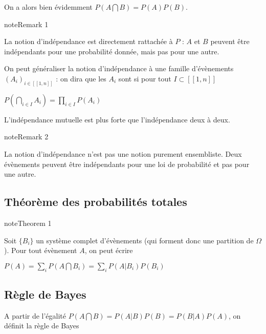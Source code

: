 \documentclass[letterpaper,10pt,english]{jupyterBook}
\begin{document}
\sphinxAtStartPar
On a alors bien évidemment \(P(A\bigcap B) = P(A)P(B)\).
\label{Rappels:remark-14}
\begin{sphinxadmonition}{note}{Remark 1}



\sphinxAtStartPar
La notion d’indépendance est directement rattachée à \(P\) : \(A\) et \(B\) peuvent être indépendants pour une probabilité donnée, mais pas pour une autre.
\end{sphinxadmonition}

\sphinxAtStartPar
On peut généraliser la notion d’indépendance à une famille d’évènements \((A_i)_{i\in[\![1,n]\!]}\) : on dira que les \(A_i\) sont  si pour tout \(I\subset [\![1,n]\!]\)

\sphinxAtStartPar
\(P\left (\displaystyle\bigcap_{i\in I} A_i\right ) = \displaystyle\prod_{i\in I} P(A_i)\)

\sphinxAtStartPar
L’indépendance mutuelle est plus forte que l’indépendance deux à deux.
\label{Rappels:remark-15}
\begin{sphinxadmonition}{note}{Remark 2}



\sphinxAtStartPar
La notion d’indépendance n’est pas une notion purement ensembliste. Deux évènements peuvent être indépendants pour une loi de probabilité et pas pour une autre.
\end{sphinxadmonition}


\subsection{Théorème des probabilités totales}
\label{\detokenize{Rappels:theoreme-des-probabilites-totales}}\label{Rappels:theorem-16}
\begin{sphinxadmonition}{note}{Theorem 1}



\sphinxAtStartPar
Soit \(\{B_i\}\) un système complet d’évènements (qui forment donc une partition de \(\Omega\)). Pour tout évènement \(A\), on peut écrire

\sphinxAtStartPar
\(P(A) = \displaystyle\sum_i P(A\bigcap B_i) = \displaystyle\sum_i P(A| B_i) P(B_i)\)
\end{sphinxadmonition}


\subsection{Règle de Bayes}
\label{\detokenize{Rappels:regle-de-bayes}}
\ignorespaces 
\sphinxAtStartPar
A partir de l’égalité \(P(A\bigcap B) = P(A|B)P(B)=P(B|A)P(A)\), on définit la règle de Bayes
\end{document}
